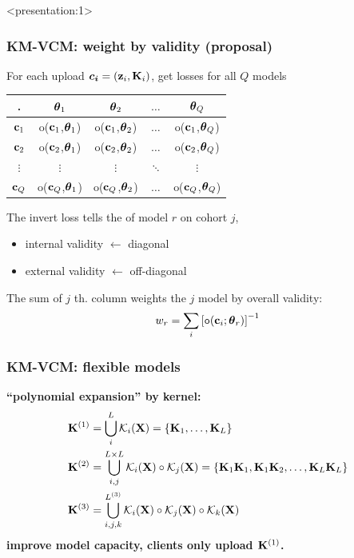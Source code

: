 \documentclass{beamer}
\newcommand{\ef}{{\mathtt{o}}} %
\newcommand{\kn}{\mathcal{K}} %
\begin{document}
\begin{frame}<presentation:1> %
  \frametitle{KM-VCM: weight by validity (proposal)} %
  For each upload $\boldsymbol{c_i}=(\mathbf{z}_i, \mathbf{K}_i)$, get losses for all $Q$ models
  \begin{table}[]
    \small
    \begin{tabular}{c|cccc}
      .           & $\boldsymbol{\theta}_1$            & $\boldsymbol{\theta}_2$            & $\dots$  & $\boldsymbol{\theta}_Q$            \\ \hline
      $\mathbf{c}_1$     & o($\mathbf{c}_1$,$\boldsymbol{\theta}_1$) & o($\mathbf{c}_1$,$\boldsymbol{\theta}_2$) & $\dots$  & o($\mathbf{c}_1$,$\boldsymbol{\theta}_Q$) \\
      $\mathbf{c}_2$     & o($\mathbf{c}_2$,$\boldsymbol{\theta}_1$) & o($\mathbf{c}_2$,$\boldsymbol{\theta}_2$) & $\dots$  & o($\mathbf{c}_2$,$\boldsymbol{\theta}_Q$) \\
      $\vdots$    & $\vdots$               & $\vdots$               & $\ddots$ & $\vdots$               \\
      $\mathbf{c}_Q$     & o($\mathbf{c}_Q$,$\boldsymbol{\theta}_1$) & o($\mathbf{c}_Q$,$\boldsymbol{\theta}_2$) & $\dots$  & o($\mathbf{c}_Q$,$\boldsymbol{\theta}_Q$) \\
    \end{tabular}
  \end{table}
  The invert loss \red{$[\ef(\vc_i, \vtheta_j)]^{-1}$} tells the
   of model $r$ on cohort $j$,
  \begin{itemize}
  \item internal validity $\leftarrow$ diagonal
  \item external validity $\leftarrow$ off-diagonal
  \end{itemize}
  The sum of $j$ th. column weights the $j$ model by overall validity:
  \begin{align}
    w_r = \sum_i{\left[\ef( \vc_i; \vtheta_r)\right]^{-1}}
  \end{align}
  
\end{frame}
\begin{frame}%
  \frametitle{KM-VCM: flexible models}
  \textbf{``polynomial expansion'' by kernel:}
  \begin{align*}
    \xk^{(1)} & = \bigcup_{i}^L \kn_i(\xx) = \{\xk_1, \dots, \xk_L\} \\
    \xk^{(2)} & = \bigcup_{i,j}^{L \times L} \kn_i(\xx) \circ \kn_j(\xx) = \{\xk_1\xk_1, \xk_1\xk_2, \dots, \xk_L\xk_L\} \\
    \xk^{(3)} & = \bigcup_{i,j,k}^{L^{(3)}}  \kn_i(\xx) \circ \kn_j(\xx) \circ \kn_k(\xx)
  \end{align*}
  {\color{blue}\textbf{improve model capacity, clients only upload $\mathbf{K}^{(1)}$.}}
\end{frame}
\end{document}
